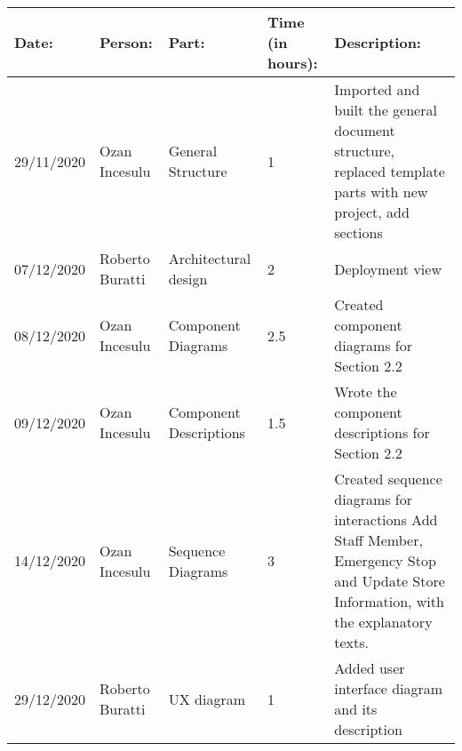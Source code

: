 \begin{table}[h]
    \begin{tabular}{|p{2cm}|p{2cm}|p{2cm}|p{1.5cm}|p{8cm}|}
        \hline

        Date:      & Person:       & Part:             & Time (in hours): & Description:                                       \\ \hline
        29/11/2020 & Ozan Incesulu & General Structure & 1             & Imported and built the general document structure, replaced template parts with new project, add sections\\ \hline
        07/12/2020 & Roberto Buratti & Architectural design & 2                 & Deployment view\\ \hline
        08/12/2020 & Ozan Incesulu & Component Diagrams & 2.5 & Created component diagrams for Section 2.2 \\ \hline
        09/12/2020 & Ozan Incesulu & Component Descriptions & 1.5 & Wrote the component descriptions for Section 2.2 \\ \hline
        14/12/2020 & Ozan Incesulu & Sequence Diagrams& 3 & Created sequence diagrams for interactions Add Staff Member, Emergency Stop and Update Store Information, with the explanatory texts.\\ \hline
        29/12/2020 & Roberto Buratti & UX diagram & 1                 & Added user interface diagram and its description\\ \hline
    \end{tabular}
\end{table}
